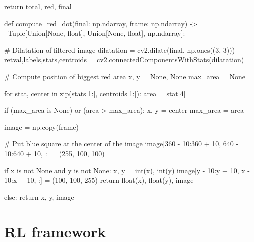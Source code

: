 \begin{pyverbatim}
    return total, red, final


def compute_red_dot(final: np.ndarray, frame: np.ndarray) -> \
Tuple[Union[None, float], Union[None, float], np.ndarray]:

    # Dilatation of filtered image
    dilatation = cv2.dilate(final, np.ones((3, 3)))
    retval,labels,stats,centroids = cv2.connectedComponentsWithStats(dilatation)

    # Compute position of biggest red area
    x, y = None, None
    max_area = None

    for stat, center in zip(stats[1:], centroids[1:]):
        area = stat[4]

        if (max_area is None) or (area > max_area):
            x, y = center
            max_area = area

    image = np.copy(frame)

    # Put blue square at the center of the image
    image[360 - 10:360 + 10, 640 - 10:640 + 10, :] = (255, 100, 100)

    if x is not None and y is not None:
        x, y = int(x), int(y)
        image[y - 10:y + 10, x - 10:x + 10, :] = (100, 100, 255)
        return float(x), float(y), image

    else:
        return x, y, image

\end{pyverbatim}

\section{RL framework}

